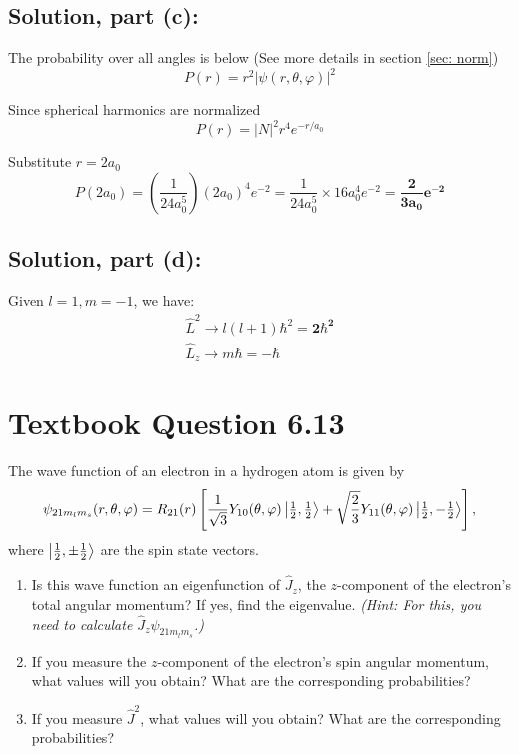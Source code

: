 \documentclass[12pt]{article}
\begin{document}
    \subsection{Solution, part (c):}
        The probability over all angles is below (See more details in section \ref{sec: norm})
        \[
            P(r) = r^2 |\psi(r,\theta,\varphi)|^2
        \]

        Since spherical harmonics are normalized
        \[
            P(r) = |N|^2 r^4 e^{-r/a_0}
        \]

        Substitute $r = 2 a_0$
        \[
            P(2a_0) = \left( \frac{1}{24 a_0^5} \right) (2a_0)^4 e^{-2}
            = \frac{1}{24 a_0^5} \times 16 a_0^4 e^{-2} =
            \boldsymbol{\boxed{ \frac{2}{3 a_0} e^{-2}}}
        \]

    \subsection{Solution, part (d):}

    Given \( l = 1, m = -1 \), we have:
    \begin{align*}
        \hat{L}^2 \to l(l+1)\hbar^2 = \boldsymbol{\boxed{2\hbar^2}} \\
        \hat{L}_z \to m \hbar = \boldsymbol{\boxed{-\hbar}}
    \end{align*}

\section{Textbook Question 6.13}
    The wave function of an electron in a hydrogen atom is given by
    \[
        \psi_{21m_lm_s}(r, \theta, \varphi) = R_{21}(r) \left[ \frac{1}{\sqrt{3}} Y_{10}(\theta, \varphi) \ket{\tfrac{1}{2}, \tfrac{1}{2}} + \sqrt{\frac{2}{3}} Y_{11}(\theta, \varphi) \ket{\tfrac{1}{2}, -\tfrac{1}{2}} \right],
    \]
    where \( \ket{\tfrac{1}{2}, \pm \tfrac{1}{2}} \) are the spin state vectors.
    
    \begin{enumerate}
        \item[(a)] Is this wave function an eigenfunction of \( \hat{J}_z \), the \( z \)-component of the electron’s total angular momentum? If yes, find the eigenvalue. \textit{(Hint: For this, you need to calculate \( \hat{J}_z \psi_{21m_lm_s} \).)}

        \item[(b)] If you measure the \( z \)-component of the electron’s spin angular momentum, what values will you obtain? What are the corresponding probabilities?
        
        \item[(c)] If you measure \( \hat{J}^2 \), what values will you obtain? What are the corresponding probabilities?
    \end{enumerate}
    
\end{document}
